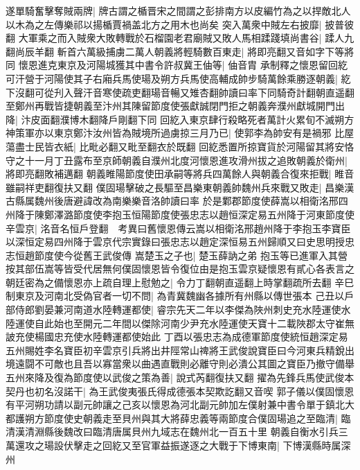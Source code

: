 遂單騎奮擊奪賊兩牌|{
	牌古謂之楯晋宋之間謂之彭排南方以皮編竹為之以捍敵北人以木為之左傳樂祁以揚楯賈禍盖北方之用木也尚矣}
突入萬衆中賊左右披靡|{
	披普彼翻}
大軍乘之而入賊衆大敗轉戰於石榴園老君廟賊又敗人馬相蹂踐填尚書谷|{
	蹂人九翻尚辰羊翻}
斬首六萬級捕虜二萬人朝義將輕騎數百東走|{
	將即亮翻又音如字下等將同}
懷恩進克東京及河陽城獲其中書令許叔冀王伷等|{
	伷音胄}
承制釋之懷恩留回紇可汗營于河陽使其子右廂兵馬使瑒及朔方兵馬使高輔成帥步騎萬餘乘勝逐朝義|{
	紇下沒翻可從刋入聲汗音寒使疏吏翻瑒音暢又雉杏翻帥讀曰率下同騎奇計翻朝直遥翻}
至鄭州再戰皆捷朝義至汴州其陳留節度使張獻誠閉門拒之朝義奔濮州獻城開門出降|{
	汴皮面翻濮博木翻降戶剛翻下同}
回紇入東京肆行殺略死者萬計火累旬不滅朔方神策軍亦以東京鄭汴汝州皆為賊境所過虜掠三月乃已|{
	使郭李為帥安有是禍邪}
比屋蕩盡士民皆衣紙|{
	比毗必翻又毗至翻衣於既翻}
回紇悉置所掠寶貨於河陽留其將安恪守之十一月丁丑露布至京師朝義自濮州北度河懷恩進攻滑州拔之追敗朝義於衛州|{
	將即亮翻敗補邁翻}
朝義睢陽節度使田承嗣等將兵四萬餘人與朝義合復來拒戰|{
	睢音雖嗣祥吏翻復扶又翻}
僕固瑒擊破之長驅至昌樂東朝義帥魏州兵來戰又敗走|{
	昌樂漢古縣属魏州後唐避諱改為南樂樂音洛帥讀曰率}
於是鄴郡節度使薛嵩以相衛洺邢四州降于陳鄭澤潞節度使李抱玉恒陽節度使張忠志以趙恒深定易五州降于河東節度使辛雲京|{
	洺音名恒戶登翻　考異曰舊懷恩傳云嵩以相衛洺邢趙州降于李抱玉李寶臣以深恒定易四州降于雲京代宗實錄曰張忠志以趙定深恒易五州歸順又曰史思明授忠志恒趙節度使今從舊王武俊傳}
嵩楚玉之子也|{
	楚玉薛訥之弟}
抱玉等已進軍入其營按其部伍嵩等皆受代居無何僕固懷恩皆令復位由是抱玉雲京疑懷恩有貳心各表言之朝廷密為之備懷恩亦上疏自理上慰勉之|{
	令力丁翻朝直遥翻上時掌翻疏所去翻}
辛巳制東京及河南北受偽官者一切不問|{
	為青冀魏幽各據所有州縣以傳世張本}
己丑以戶部侍郎劉晏兼河南道水陸轉運都使|{
	睿宗先天二年以李傑為陜州刺史充水陸運使水陸運使自此始也至開元二年間以傑除河南少尹充水陸運使天寶十二載陜郡太守崔無詖充使楊國忠充使水陸轉運都使始此}
丁酉以張忠志為成德軍節度使統恒趙深定易五州賜姓李名寶臣初辛雲京引兵將出井陘常山禆將王武俊說寶臣曰今河東兵精銳出境遠闘不可敵也且吾以寡當衆以曲遇直戰則必離守則必潰公其圖之寶臣乃撤守備舉五州來降及復為節度使以武俊之策為善|{
	說式芮翻復扶又翻}
擢為先鋒兵馬使武俊本契丹也初名沒諾干|{
	為王武俊夷張氏得成德張本契欺訖翻又音喫}
郭子儀以僕固懷恩有平河朔功請以副元帥讓之己亥以懷恩為河北副元帥加左僕射兼中書令單于鎮北大都護朔方節度使史朝義走至貝州與其大將薛忠義等兩節度合僕固瑒追之至臨清|{
	臨清漢清淵縣後魏改曰臨清唐属貝州九域志在魏州北一百五十里}
朝義自衡水引兵三萬還攻之瑒設伏擊走之回紇又至官軍益振遂逐之大戰于下博東南|{
	下博漢縣時属深州}
